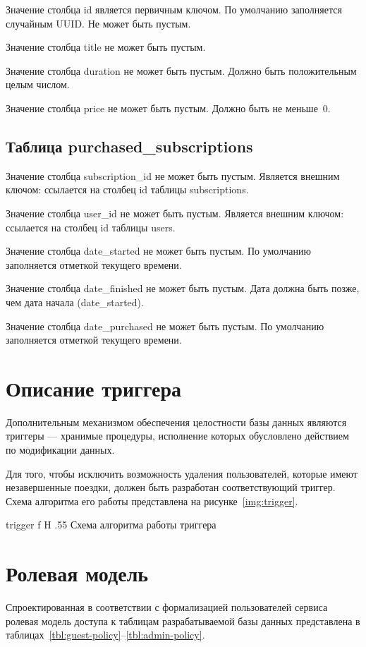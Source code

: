 Значение столбца id является первичным ключом. По умолчанию заполняется случайным UUID. Не может быть пустым.

Значение столбца title не может быть пустым.

Значение столбца duration не может быть пустым. Должно быть положительным целым числом.

Значение столбца price не может быть пустым. Должно быть не меньше~0.

\subsection*{Таблица purchased\_subscriptions}

Значение столбца subscription\_id не может быть пустым. Является внешним ключом: ссылается на столбец id таблицы subscriptions.

Значение столбца user\_id не может быть пустым. Является внешним ключом: ссылается на столбец id таблицы users.

Значение столбца date\_started не может быть пустым. По умолчанию заполняется отметкой текущего времени.

Значение столбца date\_finished не может быть пустым. Дата должна быть позже, чем дата начала (date\_started).

Значение столбца date\_purchased не может быть пустым. По умолчанию заполняется отметкой текущего времени.

\pagebreak
\section{Описание триггера}

Дополнительным механизмом обеспечения целостности базы данных являются триггеры --- хранимые процедуры, исполнение которых обусловлено действием по модификации данных.

Для того, чтобы исключить возможность удаления пользователей, которые имеют незавершенные поездки, должен быть разработан соответствующий триггер. Схема алгоритма его работы представлена на рисунке~\ref{img:trigger}.

{trigger}
{f}
{H}
{.55\textwidth}
{Схема алгоритма работы триггера}

\section{Ролевая модель}

Спроектированная в соответствии с формализацией пользователей сервиса ролевая модель доступа к таблицам разрабатываемой базы данных представлена в таблицах~\ref{tbl:guest-policy}--\ref{tbl:admin-policy}.


